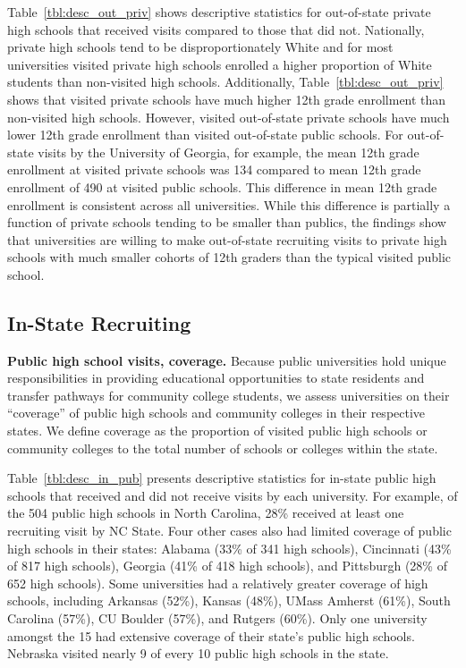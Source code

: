 \documentclass[twoside]{article}
\begin{document}
Table~\ref{tbl:desc_out_priv} shows descriptive statistics for out-of-state private high schools that received visits compared to those that did not. Nationally, private high schools tend to be disproportionately White and for most universities visited private high schools enrolled a higher proportion of White students than non-visited high schools. Additionally, Table~\ref{tbl:desc_out_priv} shows that visited private schools have much higher 12th grade enrollment than non-visited high schools. However, visited out-of-state private schools have much lower 12th grade enrollment than visited out-of-state public schools. For out-of-state visits by the University of Georgia, for example, the mean 12th grade enrollment at visited private schools was 134 compared to mean 12th grade enrollment of 490 at visited public schools. This difference in mean 12th grade enrollment is consistent across all universities. While this difference is partially a function of private schools tending to be smaller than publics, the findings show that universities are willing to make out-of-state recruiting visits to private high schools with much smaller cohorts of 12th graders than the typical visited public school.

\subsection*{In-State Recruiting}

\textbf{Public high school visits, coverage.} Because public universities hold unique responsibilities in providing educational opportunities to state residents and transfer pathways for community college students, we assess universities on their ``coverage'' of public high schools and community colleges in their respective states. We define coverage as the proportion of visited public high schools or community colleges to the total number of schools or colleges within the state.

Table~\ref{tbl:desc_in_pub} presents descriptive statistics for in-state public high schools that received and did not receive visits by each university. For example, of the 504 public high schools in North Carolina, 28\% received at least one recruiting visit by NC State.  Four other cases also had limited coverage of public high schools in their states: Alabama (33\% of 341 high schools), Cincinnati (43\% of 817 high schools), Georgia (41\% of 418 high schools), and Pittsburgh (28\% of 652 high schools). Some universities had a relatively greater coverage of high schools, including Arkansas (52\%), Kansas (48\%), UMass Amherst (61\%), South Carolina (57\%), CU Boulder (57\%), and Rutgers (60\%). Only one university amongst the 15 had extensive coverage of their state’s public high schools. Nebraska visited nearly 9 of every 10 public high schools in the state.
\end{document}

